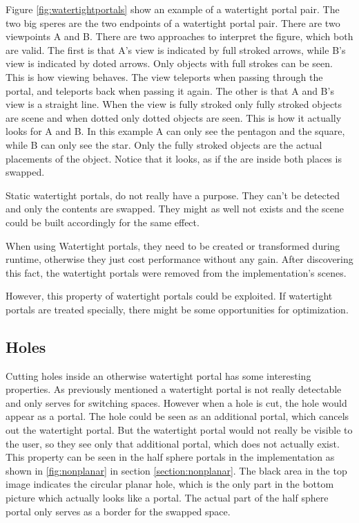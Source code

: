 Figure \ref{fig:watertightportals} show an example of a watertight portal pair. The two big speres are the two endpoints of a watertight portal pair. There are two viewpoints A and B.
There are two approaches to interpret the figure, which both are valid.
The first is that A's view is indicated by full stroked arrows, while B's view is indicated by doted arrows.  Only objects with full strokes can be seen. This is how viewing behaves. The view teleports when passing through the portal, and teleports back when passing it again.
The other is that A and B's view is a straight line. When the view is fully stroked only fully stroked objects are scene and when dotted only dotted objects are seen. This is how it actually looks for A and B.
In this example A can only see the pentagon and the square, while B can only see the star. Only the fully stroked objects are the actual placements of the object. Notice that it looks, as if the are inside both places is swapped.

Static watertight portals, do not really have a purpose. They can't be detected and only the contents are swapped. They might as well not exists and the scene could be built accordingly for the same effect.

When using Watertight portals, they need to be created or transformed during runtime, otherwise they just cost performance without any gain. After discovering this fact, the watertight portals were removed from the implementation's scenes.

However, this property of watertight portals could be exploited. If watertight portals are treated specially, there might be some opportunities for optimization.

\subsection{Holes}
Cutting holes inside an otherwise watertight portal has some interesting properties. As previously mentioned a watertight portal is not really detectable and only serves for switching spaces. However when a hole is cut, the hole would appear as a portal. The hole could be seen as an additional portal, which cancels out the watertight portal. But the watertight portal would not really be visible to the user, so they see only that additional portal, which does not actually exist. This property can be seen in the half sphere portals in the implementation as shown in \ref{fig:nonplanar} in section \ref{section:nonplanar}. The black area in the top image indicates the circular planar hole, which is the only part in the bottom picture which actually looks like a portal. The actual part of the half sphere portal only serves as a border for the swapped space.
